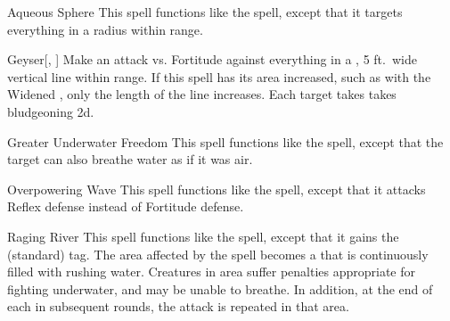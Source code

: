 \lowercase{\hypertarget{spell:Aqueous Sphere}{}}\label{spell:Aqueous Sphere}
\begin{ability}[\nth{2}]{\hypertarget{spell:Aqueous Sphere}{Aqueous Sphere}}
This spell functions like the  spell, except that it targets everything in a \areasmall radius within \rngclose range.
\end{ability}
\vspace{0.25em}



\lowercase{\hypertarget{spell:Geyser}{}}\label{spell:Geyser}
\begin{ability}[\nth{2}]{\hypertarget{spell:Geyser}{Geyser}}[, ]
Make an attack vs. Fortitude against everything in a \arealarge, 5 ft.\ wide vertical line within \rngmed range.
If this spell has its area increased, such as with the Widened , only the length of the line increases.
\hit Each target takes takes bludgeoning  \plus2d.
\end{ability}
\vspace{0.25em}



\lowercase{\hypertarget{spell:Greater Underwater Freedom}{}}\label{spell:Greater Underwater Freedom}
\begin{ability}[\nth{3}]{\hypertarget{spell:Greater Underwater Freedom}{Greater Underwater Freedom}}
This spell functions like the  spell, except that the target can also breathe water as if it was air.
\end{ability}
\vspace{0.25em}



\lowercase{\hypertarget{spell:Overpowering Wave}{}}\label{spell:Overpowering Wave}
\begin{ability}[\nth{3}]{\hypertarget{spell:Overpowering Wave}{Overpowering Wave}}
This spell functions like the  spell, except that it attacks Reflex defense instead of Fortitude defense.
\end{ability}
\vspace{0.25em}



\lowercase{\hypertarget{spell:Raging River}{}}\label{spell:Raging River}
\begin{ability}[\nth{3}]{\hypertarget{spell:Raging River}{Raging River}}
This spell functions like the  spell, except that it gains the  (standard) tag.
The area affected by the spell becomes a  that is continuously filled with rushing water.
Creatures in area suffer penalties appropriate for fighting underwater, and may be unable to breathe.
In addition, at the end of each  in subsequent rounds, the attack is repeated in that area.
\end{ability}
\vspace{0.25em}



